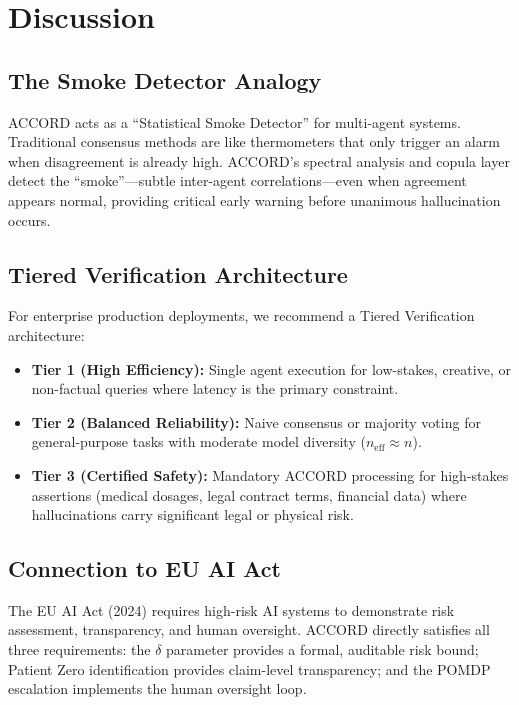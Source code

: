 \documentclass[12pt,a4paper]{report}
\begin{document}
\section{Discussion}

\subsection{The Smoke Detector Analogy}

ACCORD acts as a ``Statistical Smoke Detector'' for multi-agent systems. Traditional consensus methods are like thermometers that only trigger an alarm when disagreement is already high. ACCORD's spectral analysis and copula layer detect the ``smoke''---subtle inter-agent correlations---even when agreement appears normal, providing critical early warning before unanimous hallucination occurs.

\subsection{Tiered Verification Architecture}
\label{sec:discussion}

For enterprise production deployments, we recommend a Tiered Verification architecture:

\begin{itemize}
    \item \textbf{Tier 1 (High Efficiency):} Single agent execution for low-stakes, creative, or non-factual queries where latency is the primary constraint.
    \item \textbf{Tier 2 (Balanced Reliability):} Naive consensus or majority voting for general-purpose tasks with moderate model diversity ($n_{\text{eff}} \approx n$).
    \item \textbf{Tier 3 (Certified Safety):} Mandatory ACCORD processing for high-stakes assertions (medical dosages, legal contract terms, financial data) where hallucinations carry significant legal or physical risk.
\end{itemize}

\subsection{Connection to EU AI Act}

The EU AI Act (2024) requires high-risk AI systems to demonstrate risk assessment, transparency, and human oversight. ACCORD directly satisfies all three requirements: the $\delta$ parameter provides a formal, auditable risk bound; Patient Zero identification provides claim-level transparency; and the POMDP escalation implements the human oversight loop.
\end{document}
